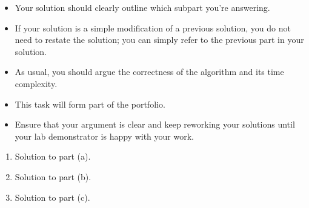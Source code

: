 \documentclass{article}
\begin{document}
\begin{rubric}
\begin{itemize}
    \item Your solution should clearly outline which subpart you're answering.

    \item If your solution is a simple modification of a previous solution, you do not need to restate the solution; you can simply refer to the previous part in your solution.

    \item As usual, you should argue the correctness of the algorithm and its time complexity.

    \item This task will form part of the portfolio.
    \item Ensure that your argument is clear and keep reworking your solutions until your lab demonstrator is happy with your work.
\end{itemize}
\end{rubric}

\begin{solution}
\begin{enumerate}[label = (\alph*)]
    \item Solution to part (a).

    \item Solution to part (b).

    \item Solution to part (c).
\end{enumerate}
\end{solution}
\end{document}
